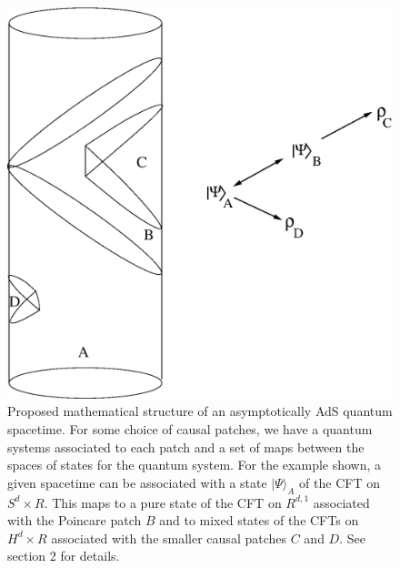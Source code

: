 \documentclass[12pt,epsf]{article}
\renewcommand{\(}{\left(}
\renewcommand{\)}{\right)}
\begin{document}
\begin{figure}
\centering
\includegraphics[width=\textwidth]{patches.eps}
\caption{Proposed mathematical structure of an asymptotically AdS quantum spacetime. For some choice of causal patches, we have a quantum systems associated to each patch and a set of maps between the spaces of states for the quantum system. For the example shown, a given spacetime can be associated with a state $| \Psi \rangle_A$ of the CFT on $S^d \times R$. This maps to a pure state of the CFT on $R^{d,1}$ associated with the Poincare patch $B$ and to mixed states of the CFTs on $H^d \times R$ associated with the smaller causal patches $C$ and $D$. See section 2 for details.}
\end{figure}
\end{document}
